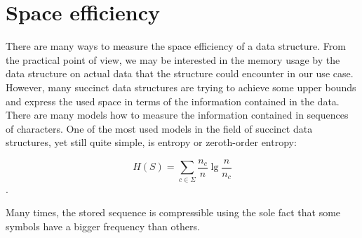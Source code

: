 \section{Space efficiency}

There are many ways to measure the space efficiency of a data structure. From the
practical point of view, we may be interested in the memory usage by the data
structure on actual data that the structure could encounter in our use case. However,
many succinct data structures are trying to achieve some upper bounds and express
the used space in terms of the information contained in the data. There are many
models how to measure the information contained in sequences of characters. One
of the most used models in the field of succinct data structures, yet still quite
simple, is entropy or zeroth-order entropy:

$$H(S)=\sum_{c\in\Sigma} \frac{n_c}{n} \lg \frac{n}{n_c}$$.

Many times, the stored sequence is compressible using the sole fact that some symbols
have a bigger frequency than others.

\cite{raman2007succinct}
